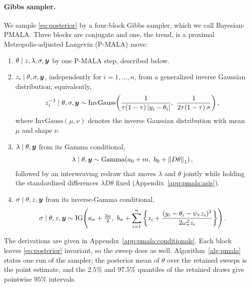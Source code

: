 \paragraph{Gibbs sampler.} We sample \eqref{eq:posterior} by a four-block Gibbs sampler, which we call Bayesian-PMALA. Three blocks are conjugate and one, the trend, is a proximal Metropolis-adjusted Langevin (P-MALA) move:
\begin{enumerate}
    \item $\theta \mid z, \lambda, \sigma, \bm{y}$ by one P-MALA step, described below.
    \item $z_i \mid \theta, \sigma, \bm{y}$, independently for $i = 1, \ldots, n$, from a generalized inverse Gaussian distribution; equivalently,
    \begin{equation}
        z_i^{-1} \mid \theta, \sigma, \by \sim \mathrm{InvGauss}\!\left(\frac{1}{\tau(1-\tau)\,|y_i - \theta_i|},\ \frac{1}{2\tau(1-\tau)\,\sigma}\right),
        \label{eq:zupdate}
    \end{equation}
    where $\mathrm{InvGauss}(\mu, \nu)$ denotes the inverse Gaussian distribution with mean $\mu$ and shape $\nu$.
    \item $\lambda \mid \theta, \bm{y}$ from its Gamma conditional,
    \begin{equation}
        \lambda \mid \theta, \bm{y} \sim \mathrm{Gamma}\!\left(a_0 + m,\ b_0 + \left\lVert D\theta\right\rVert_1\right),
        \label{eq:lambdaupdate}
    \end{equation}
    followed by an interweaving redraw that moves $\lambda$ and $\theta$ jointly while holding the standardized differences $\lambda D\theta$ fixed (Appendix~\ref{app:pmala:asis}).
    \item $\sigma \mid \theta, z, \bm{y}$ from its inverse-Gamma conditional,
    \begin{equation}
        \sigma \mid \theta, z, \by \sim \mathrm{IG}\!\left(a_\sigma + \tfrac{3n}{2},\ b_\sigma + \sum_{i=1}^n \left\{ z_i + \frac{(y_i - \theta_i - \psi_\tau z_i)^2}{2\omega_\tau^2 z_i}\right\}\right).
        \label{eq:sigmaupdate}
    \end{equation}
\end{enumerate}
The derivations are given in Appendix~\ref{app:pmala:conditionals}. Each block leaves \eqref{eq:posterior} invariant, so the sweep does as well. Algorithm~\ref{alg:pmala} states one run of the sampler; the posterior mean of $\theta$ over the retained sweeps is the point estimate, and the $2.5\%$ and $97.5\%$ quantiles of the retained draws give pointwise $95\%$ intervals.

